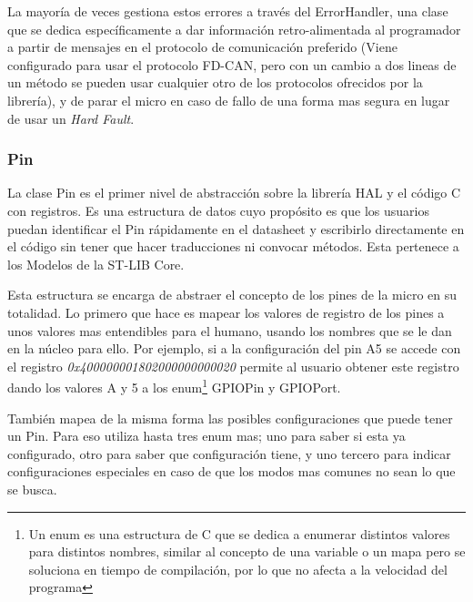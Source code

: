 \documentclass{report}
\begin{document}
La mayoría de veces gestiona estos errores a través del ErrorHandler, una clase que se dedica específicamente a dar información retro-alimentada al programador a partir de mensajes en el protocolo de comunicación preferido (Viene configurado para usar el protocolo FD-CAN, pero con un cambio a dos lineas de un método se pueden usar cualquier otro de los protocolos ofrecidos por la librería), y de parar el micro en caso de fallo de una forma mas segura en lugar de usar un \textit{Hard Fault}. 

\subsubsection{Pin}
La clase Pin es el primer nivel de abstracción sobre la librería HAL y el código C con registros. Es una estructura de datos cuyo propósito es que los usuarios puedan identificar el Pin rápidamente en el datasheet y escribirlo directamente en el código sin tener que hacer traducciones ni convocar métodos. Esta pertenece a los Modelos de la ST-LIB Core.
\par \vspace{0.3 cm}
Esta estructura se encarga de abstraer el concepto de los pines de la micro en su totalidad. Lo primero que hace es mapear los valores de registro de los pines a unos valores mas entendibles para el humano, usando los nombres que se le dan en la núcleo para ello. Por ejemplo, si a la configuración del pin A5 se accede con el registro \textit{0x400000001802000000000020} permite al usuario obtener este registro dando los valores A y 5 a los enum\footnote{Un enum es una estructura de C que se dedica a enumerar distintos valores para distintos nombres, similar al concepto de una variable o un mapa pero se soluciona en tiempo de compilación, por lo que no afecta a la velocidad del programa}   GPIOPin y GPIOPort. 
\par \vspace{0.3 cm}
También mapea de la misma forma las posibles configuraciones que puede tener un Pin. Para eso utiliza hasta tres enum mas; uno para saber si esta ya configurado, otro para saber que configuración tiene, y uno tercero para indicar configuraciones especiales en caso de que los modos mas comunes no sean lo que se busca. 
\par \vspace{0.3 cm}
\end{document}
